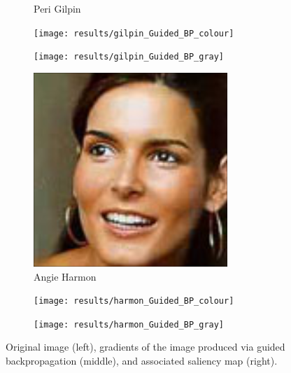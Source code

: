 \documentclass{article}
\begin{document}
\begin{figure}
\begin{subfigure}[t]{0.33\linewidth}
		\caption{Peri Gilpin}
	\end{subfigure}
	\begin{subfigure}[t]{0.33\linewidth}
		\texttt{[image: results/gilpin\_Guided\_BP\_colour]}
	\end{subfigure}
	\begin{subfigure}[t]{0.33\linewidth}
		\texttt{[image: results/gilpin\_Guided\_BP\_gray]}
	\end{subfigure}\vspace{1em}
	\begin{subfigure}[t]{0.33\linewidth}
		\includegraphics[width=\linewidth]{most_harmon}
		\caption{Angie Harmon}
	\end{subfigure}
	\begin{subfigure}[t]{0.33\linewidth}
		\texttt{[image: results/harmon\_Guided\_BP\_colour]}
	\end{subfigure}
	\begin{subfigure}[t]{0.33\linewidth}
		\texttt{[image: results/harmon\_Guided\_BP\_gray]}
	\end{subfigure}\vspace{1em}
	\caption{Original image (left), gradients of the image produced via guided backpropagation (middle), and associated saliency map (right).}
\end{figure}
\end{document}
